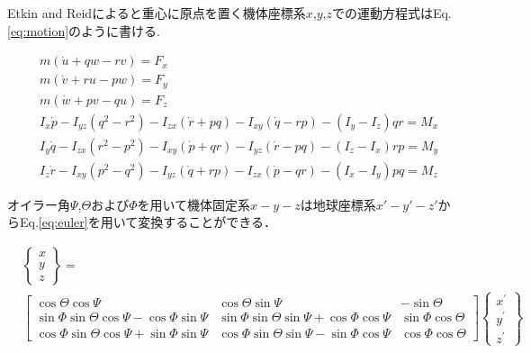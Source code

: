     \par
    Etkin and Reidによると重心に原点を置く機体座標系$x$,$y$,$z$での運動方程式はEq.\eqref{eq:motion}のように書ける.

    \begin{equation}
        \begin{aligned}
        & m(\dot{u}+q w-r v)=F_x \\
        & m(\dot{v}+r u-p w)=F_y \\
        & m(\dot{w}+p v-q u)=F_z \\
        & I_x \dot{p}-I_{y z}\left(q^2-r^2\right)-I_{z x}(\dot{r}+p q)-I_{x y}(\dot{q}-r p)-\left(I_y-I_z\right) q r=M_x \\
        & I_y \dot{q}-I_{z x}\left(r^2-p^2\right)-I_{x y}(\dot{p}+q r)-I_{y z}(\dot{r}-p q)-\left(I_z-I_x\right) r p=M_y \\
        & I_z \dot{r}-I_{x y}\left(p^2-q^2\right)-I_{y z}(\dot{q}+r p)-I_{z x}(\dot{p}-q r)-\left(I_x-I_y\right) p q=M_z   \label{eq:motion}
        \end{aligned}
    \end{equation}


    オイラー角$\Psi$,$\Theta$および$\Phi$を用いて機体固定系$x-y-z$は地球座標系$x'-y'-z'$からEq.\eqref{eq:euler}を用いて変換することができる．


    \begin{equation}
        \begin{aligned}
        & \left\{\begin{array}{l}
        x \\
        y \\
        z
        \end{array}\right\}= \\
        & {\left[\begin{array}{ccc}
        \cos \Theta \cos \Psi & \cos \Theta \sin \Psi & -\sin \Theta \\
        \sin \Phi \sin \Theta \cos \Psi-\cos \Phi \sin \Psi & \sin \Phi \sin \Theta \sin \Psi+\cos \Phi \cos \Psi & \sin \Phi \cos \Theta \\
        \cos \Phi \sin \Theta \cos \Psi+\sin \Phi \sin \Psi & \cos \Phi \sin \Theta \sin \Psi-\sin \Phi \cos \Psi & \cos \Phi \cos \Theta
        \end{array}\right]\left\{\begin{array}{l}
        x^{\prime} \\
        y^{\prime} \\
        z^{\prime}      
        \end{array}\right\}}
        \end{aligned}
        \label{eq:euler}
    \end{equation}


